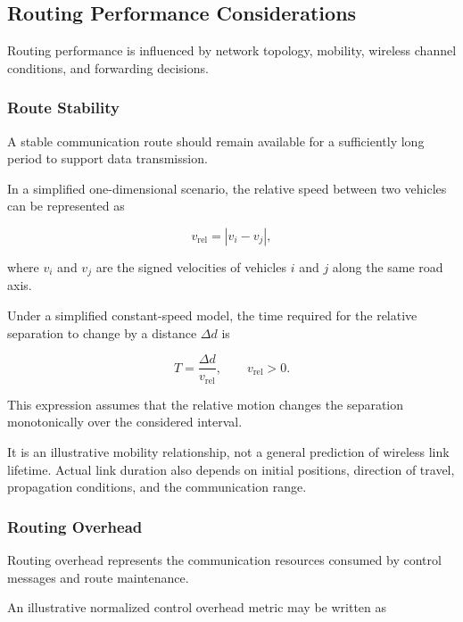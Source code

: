 \subsection{Routing Performance Considerations}
\label{sec:3C}

Routing performance is influenced
by network topology, mobility,
wireless channel conditions,
and forwarding decisions.

\subsubsection{Route Stability}

A stable communication route
should remain available
for a sufficiently long
period to support
data transmission.

In a simplified
one-dimensional scenario,
the relative speed
between two vehicles
can be represented as

\begin{equation}
v_{\mathrm{rel}} = |v_i-v_j|,
\label{eq:relative_speed}
\end{equation}

where $v_i$ and $v_j$
are the signed velocities
of vehicles $i$ and $j$
along the same road axis.

Under a simplified
constant-speed model,
the time required for
the relative separation
to change by a distance
$\Delta d$ is

\begin{equation}
T = \frac{\Delta d}{v_{\mathrm{rel}}},
\qquad v_{\mathrm{rel}}>0.
\label{eq:contact_time}
\end{equation}

This expression assumes
that the relative motion
changes the separation
monotonically over the
considered interval.

It is an illustrative
mobility relationship,
not a general prediction
of wireless link lifetime.
Actual link duration
also depends on initial
positions, direction
of travel, propagation
conditions, and the
communication range.

\subsubsection{Routing Overhead}

Routing overhead represents
the communication resources
consumed by control messages
and route maintenance.

An illustrative normalized
control overhead metric
may be written as

